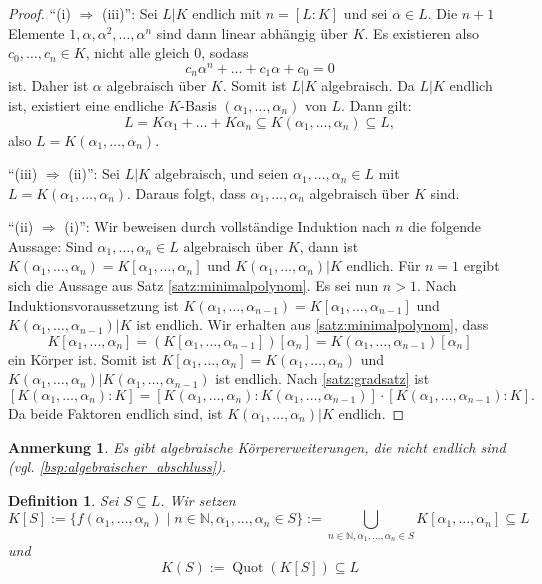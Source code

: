 \documentclass[a4paper, twoside, 11pt, ngerman]{report}
\newcommand{\NN}{\mathds N}
\DeclareMathOperator{\Quot}{Quot}
\theoremstyle{definistyle}
\newtheorem{defini}[satz]{Definition}
\newtheorem{anm}[satz]{Anmerkung}
\theoremstyle{remark}
\begin{document}
\begin{proof}
"`(i) $\Rightarrow$ (iii)"': Sei $L|K$ endlich mit $n = [L : K]$ und sei $\alpha \in L$. Die $n+1$ Elemente $1, \alpha, \alpha^2, \dots, \alpha^n$ sind dann linear abhängig über $K$.
    Es existieren also $c_0, \dots, c_n \in K$, nicht alle gleich $0$, sodass
    \[
    c_n \alpha^n + \dots + c_1 \alpha + c_0 = 0
    \]
    ist. Daher ist $\alpha$ algebraisch über $K$. Somit ist $L|K$ algebraisch.
    Da $L|K$ endlich ist, existiert eine endliche $K$-Basis $(\alpha_1, \dots, \alpha_n)$ von $L$. Dann gilt:
    \[
    L = K\alpha_1 + \ldots + K\alpha_n \subseteq K(\alpha_1, \ldots, \alpha_n) \subseteq L,
    \]
    also $L = K(\alpha_1, \ldots, \alpha_n)$.

"`(iii) $\Rightarrow$ (ii)"': Sei $L|K$ algebraisch, und seien $\alpha_1, \dots, \alpha_n \in L$ mit $L = K(\alpha_1, \dots, \alpha_n)$. Daraus folgt, dass $\alpha_1, \dots, \alpha_n$ algebraisch über $K$ sind. 

"`(ii) $\Rightarrow$ (i)"':
Wir beweisen durch vollständige Induktion nach $n$ die folgende Aussage: Sind $\alpha_1, \dots, \alpha_n\in L$ algebraisch über $K$, dann ist $K(\alpha_1,\ldots,\alpha_n)=K[\alpha_1,\ldots,\alpha_n]$ und $K(\alpha_1, \dots, \alpha_n)|K$ endlich. Für $n = 1$ ergibt sich die Aussage aus Satz \ref{satz:minimalpolynom}. Es sei nun $n>1$.
Nach Induktionsvoraussetzung ist $K(\alpha_1, \dots, \alpha_{n-1})=K[\alpha_1, \dots, \alpha_{n-1}]$ und $K(\alpha_1, \dots, \alpha_{n-1}) | K$ ist endlich. Wir erhalten aus \ref{satz:minimalpolynom}, dass
\[
K[\alpha_1, \ldots, \alpha_n] = (K[\alpha_1, \ldots, \alpha_{n-1}])[\alpha_{n}]=K(\alpha_1,\ldots,\alpha_{n-1})[\alpha_n]
\]
ein Körper ist. Somit ist $K[\alpha_1, \ldots, \alpha_n]=K(\alpha_1, \ldots, \alpha_n)$ und 
$K(\alpha_1, \ldots, \alpha_n)|K(\alpha_1, \ldots, \alpha_{n-1})$ ist endlich. Nach \ref{satz:gradsatz} ist
\[
[K(\alpha_1, \dots, \alpha_n) : K] = [K(\alpha_1, \dots, \alpha_n) : K(\alpha_1, \dots, \alpha_{n-1})] \cdot [K(\alpha_1, \dots, \alpha_{n-1}) : K].
\]
Da beide Faktoren endlich sind, ist $K(\alpha_1, \dots, \alpha_n)|K$ endlich.
\end{proof}

\begin{anm}
Es gibt algebraische Körpererweiterungen, die nicht endlich sind (vgl. \ref{bsp:algebraischer_abschluss}).
\end{anm}

\begin{defini}\label{def:erweiterung_koerper_kleinst}
Sei $S \subseteq L$. Wir setzen
\[
K[S] := \{f(\alpha_1, \dots, \alpha_n) \mid n \in \NN, \alpha_1, \dots, \alpha_n \in S\}:=\bigcup_{n\in\NN,\alpha_1,\ldots,\alpha_n\in S}K[\alpha_1,\ldots,\alpha_n] \subseteq L
\]
und
\[
K(S) := \Quot(K[S]) \subseteq L
\]
\end{defini}
\end{document}
